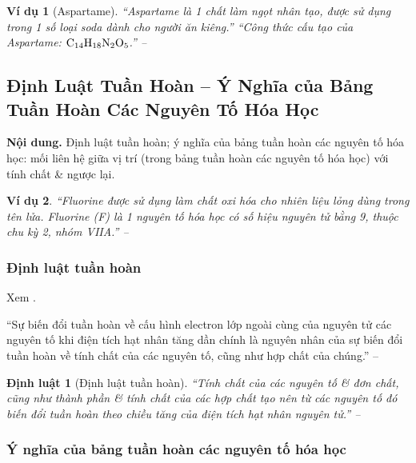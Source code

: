 \documentclass{article}
\numberwithin{equation}{section}
\newtheorem{vidu}{Ví dụ}[section]
\newtheorem{dinhluat}{Định luật}[section]
\begin{document}
\begin{vidu}[Aspartame]
	``Aspartame là 1 chất làm ngọt nhân tạo, được sử dụng trong 1 số loại soda dành cho người ăn kiêng.'' ``Công thức cấu tạo của Aspartame: $\rm C_{14}H_{18}N_2O_5$.'' -- \cite[p. 47]{SGK_Hoa_Hoc_10_Chan_Troi_Sang_Tao}
\end{vidu}


\subsection{Định Luật Tuần Hoàn -- Ý Nghĩa của Bảng Tuần Hoàn Các Nguyên Tố Hóa Học}
\textsf{\textbf{Nội dung.} Định luật tuần hoàn; ý nghĩa của bảng tuần hoàn các nguyên tố hóa học: mối liên hệ giữa vị trí (trong bảng tuần hoàn các nguyên tố hóa học) với tính chất \& ngược lại.}

\begin{vidu}
	``Fluorine được sử dụng làm chất oxi hóa cho nhiên liệu lỏng dùng trong tên lửa. Fluorine (F) là 1 nguyên tố hóa học có số hiệu nguyên tử bằng 9, thuộc chu kỳ 2, nhóm VIIA.'' -- \cite[p. 49]{SGK_Hoa_Hoc_10_Chan_Troi_Sang_Tao}
\end{vidu}

\subsubsection{Định luật tuần hoàn}
Xem \cite[Bảng 7.1: \textsf{Cấu hình electron lớp ngoài cùng của nguyên tử các nguyên tố nhóm A}, p. 49]{SGK_Hoa_Hoc_10_Chan_Troi_Sang_Tao}.

``Sự biến đổi tuần hoàn về cấu hình electron lớp ngoài cùng của nguyên tử các nguyên tố khi điện tích hạt nhân tăng dần chính là nguyên nhân của sự biến đổi tuần hoàn về tính chất của các nguyên tố, cũng như hợp chất của chúng.'' -- \cite[p. 50]{SGK_Hoa_Hoc_10_Chan_Troi_Sang_Tao}

\begin{dinhluat}[Định luật tuần hoàn]
	``Tính chất của các nguyên tố \& đơn chất, cũng như thành phần \& tính chất của các hợp chất tạo nên từ các nguyên tố đó biến đổi tuần hoàn theo chiều tăng của điện tích hạt nhân nguyên tử.'' -- \cite[p. 50]{SGK_Hoa_Hoc_10_Chan_Troi_Sang_Tao}
\end{dinhluat}

\subsubsection{Ý nghĩa của bảng tuần hoàn các nguyên tố hóa học}
\end{document}
